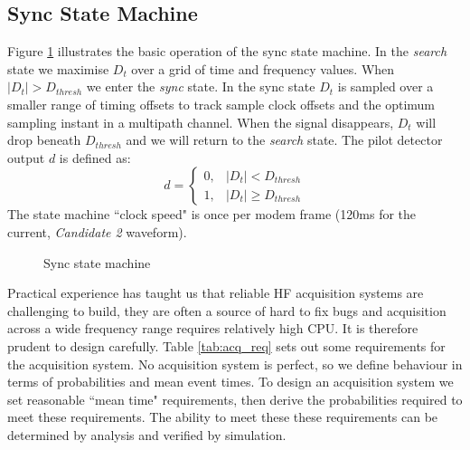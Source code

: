\documentclass{article}
\begin{document}
\subsection{Sync State Machine}

Figure \ref{fig:sync_state_mach} illustrates the basic operation of the sync state machine. In the \emph{search} state we maximise $D_t$ over a grid of time and frequency values.  When $|D_t|>D_{thresh}$ we enter the \emph{sync} state.  In the sync state $D_t$ is sampled over a smaller range of timing offsets to track sample clock offsets and the optimum sampling instant in a multipath channel.  When the signal disappears, $D_t$ will drop beneath $D_{thresh}$ and we will return to the \emph{search} state.  The pilot detector output $d$ is defined as:
\begin{equation}
d =	\begin{cases}
      0, & |D_t| < D_{thresh} \\
      1, & |D_t| \ge D_{thresh}
	\end{cases}
\end{equation}
The state machine ``clock speed" is once per modem frame (120ms for the current, \emph{Candidate 2} waveform).

\begin{figure} [H]
\caption{Sync state machine}
\vspace{5mm}
\label{fig:sync_state_mach}
\begin{center}
\end{center}
\end{figure}

Practical experience has taught us that reliable HF acquisition systems are challenging to build, they are often a source of hard to fix bugs and acquisition across a wide frequency range requires relatively high CPU.  It is therefore prudent to design carefully.  Table \ref{tab:acq_req} sets out some requirements for the acquisition system. No acquisition system is perfect, so we define behaviour in terms of probabilities and mean event times.  To design an acquisition system we set reasonable ``mean time" requirements, then derive the probabilities required to meet these requirements.  The ability to meet these these requirements can be determined by analysis and verified by simulation.
\end{document}
